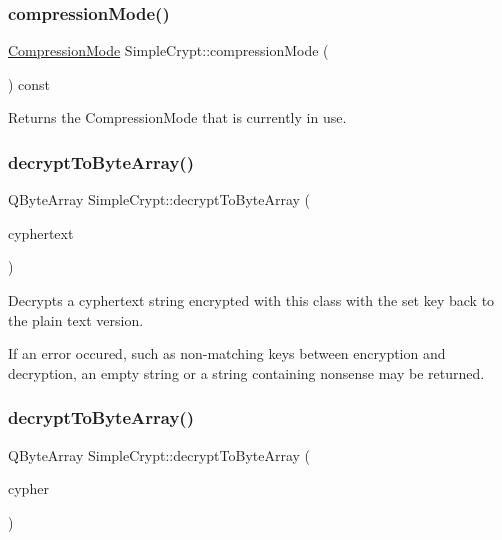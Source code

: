 \subsubsection{\texorpdfstring{compression\+Mode()}{compressionMode()}}
{\footnotesize\ttfamily \hyperlink{classSimpleCrypt_a25298e746f175cf175a18f082092ca8e}{Compression\+Mode} Simple\+Crypt\+::compression\+Mode (\begin{DoxyParamCaption}{ }\end{DoxyParamCaption}) const\hspace{0.3cm}{\ttfamily [inline]}}

Returns the Compression\+Mode that is currently in use. \mbox{\label{classSimpleCrypt_ad6785e087d449a1aa80c39248e98fcda}} 
\subsubsection{\texorpdfstring{decrypt\+To\+Byte\+Array()}{decryptToByteArray()}\hspace{0.1cm}{\footnotesize\ttfamily [1/2]}}
{\footnotesize\ttfamily Q\+Byte\+Array Simple\+Crypt\+::decrypt\+To\+Byte\+Array (\begin{DoxyParamCaption}\item[{const Q\+String \&}]{cyphertext }\end{DoxyParamCaption})}

Decrypts a cyphertext string encrypted with this class with the set key back to the plain text version.

If an error occured, such as non-\/matching keys between encryption and decryption, an empty string or a string containing nonsense may be returned. \mbox{\label{classSimpleCrypt_a4babb69e45849f672574a26b6433c85a}} 
\subsubsection{\texorpdfstring{decrypt\+To\+Byte\+Array()}{decryptToByteArray()}\hspace{0.1cm}{\footnotesize\ttfamily [2/2]}}
{\footnotesize\ttfamily Q\+Byte\+Array Simple\+Crypt\+::decrypt\+To\+Byte\+Array (\begin{DoxyParamCaption}\item[{Q\+Byte\+Array}]{cypher }\end{DoxyParamCaption})}

